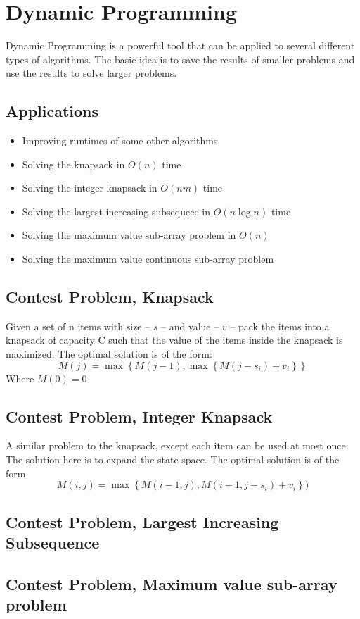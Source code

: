 \section{Dynamic Programming}
Dynamic Programming is a powerful tool that can be applied to several different types of algorithms.\cite{dppractice}
The basic idea is to save the results of smaller problems and use the results to solve larger problems.

\subsection{Applications}
\begin{itemize}
	\item	Improving runtimes of some other algorithms
	\item	Solving the knapsack in $O(n)$ time
	\item	Solving the integer knapsack in $O(nm)$ time
	\item	Solving the largest increasing subsequece in $O(n \log n)$ time
	\item	Solving the maximum value sub-array problem in $O(n)$
	\item	Solving the maximum value continuous sub-array problem
\end{itemize}

\subsection{Contest Problem, Knapsack}
Given a set of n items with size -- $s$ -- and value -- $v$ -- pack the items into a knapsack of capacity C such that the value of the items inside the knapsack is maximized.  The optimal solution is of the form:
$$M(j) = \max \left\{M(j-1), \max \left\{M(j - s_i) + v_i \right\}\right\}$$
Where $M(0) = 0$


\subsection{Contest Problem, Integer Knapsack}
A similar problem to the knapsack, except each item can be used at most once.  The solution here is to expand the state space.  The optimal solution is of the form
$$M(i,j) = \max \left\{ M(i-1, j) , M(i-1, j- s_i) + v_i \right\})$$
\subsection{Contest Problem, Largest Increasing Subsequence}
\subsection{Contest Problem, Maximum value sub-array problem}
